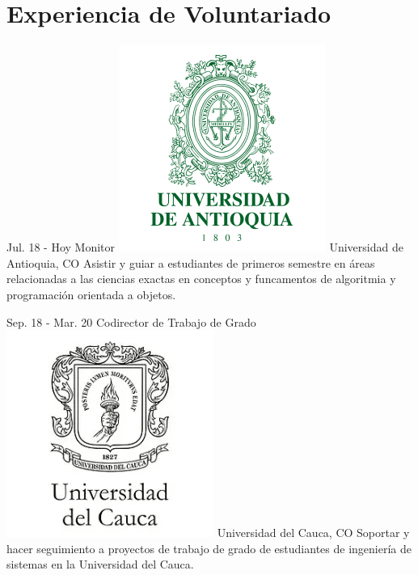 \documentclass[]{cv-class}
\begin{document}
\newpage

\section{Experiencia de Voluntariado}
\begin{entrylist}
	  
	\entry
	{Jul. 18 - Hoy}
	{Monitor}
	{{\includegraphics[scale=0.05]{img/udea-logo.png}} Universidad de Antioquia, CO} 
	{Asistir y guiar a estudiantes de primeros semestre en áreas relacionadas a las ciencias exactas en conceptos y funcamentos de algoritmia y programación orientada a objetos.}
	  
	\entry
	{Sep. 18 - Mar. 20}
	{Codirector de Trabajo de Grado}
	{{\includegraphics[scale=0.05]{img/unicauca-logo.png}} Universidad del Cauca, CO} 
	{Soportar y hacer seguimiento a proyectos de trabajo de grado de estudiantes de ingeniería de sistemas en la Universidad del Cauca.}
	

\end{entrylist}
\end{document}
